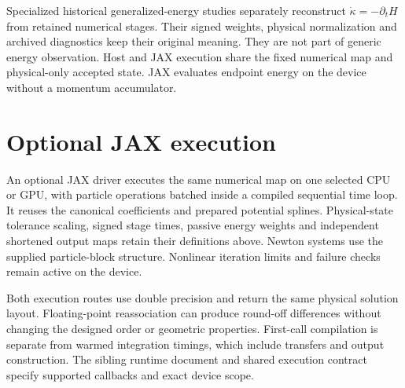 \documentclass[11pt,a4paper]{article}
\begin{document}
Specialized historical generalized-energy studies separately reconstruct
$\dot\kappa=-\partial_tH$ from retained numerical stages. Their signed weights,
physical normalization and archived diagnostics keep their original meaning.
They are not part of generic energy observation. Host and JAX execution share
the fixed numerical map and physical-only accepted state. JAX evaluates endpoint
energy on the device without a momentum accumulator.

\section{Optional JAX execution}

An optional JAX driver executes the same numerical map on one selected CPU
or GPU, with particle operations batched inside a compiled sequential time
loop. It reuses the canonical coefficients and prepared potential splines.
Physical-state tolerance scaling, signed stage times, passive energy weights
and independent shortened output maps retain their definitions above.
Newton systems use the supplied particle-block structure. Nonlinear
iteration limits and failure checks remain active on the device.

Both execution routes use double precision and return the same physical
solution layout. Floating-point reassociation can produce round-off
differences without changing the designed order or geometric properties.
First-call compilation is separate from warmed integration timings, which
include transfers and output construction. The sibling runtime document and
shared execution contract specify supported callbacks and exact device scope.
\end{document}

